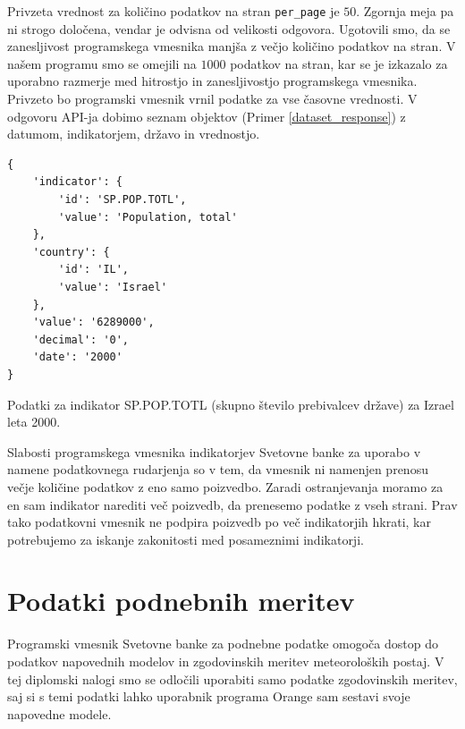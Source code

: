 
Privzeta vrednost za količino podatkov na stran \verb|per_page| je $50$. 
Zgornja meja pa ni strogo določena, vendar je odvisna od velikosti odgovora. 
Ugotovili smo, da se zanesljivost programskega vmesnika manjša z večjo 
količino podatkov na stran. V našem programu smo se omejili na $1000$ podatkov
na stran, kar se je izkazalo za uporabno razmerje med hitrostjo in 
zanesljivostjo programskega vmesnika. Privzeto bo programski vmesnik vrnil 
podatke za vse časovne vrednosti. V odgovoru API-ja dobimo seznam objektov 
(Primer \ref{dataset_response}) z datumom, indikatorjem, državo in vrednostjo.

\begin{snippet}
\begin{center}
\begin{lstlisting}
{
    'indicator': {
        'id': 'SP.POP.TOTL',
        'value': 'Population, total'
    },
    'country': {
        'id': 'IL',
        'value': 'Israel'
    },
    'value': '6289000',
    'decimal': '0',
    'date': '2000'
}
\end{lstlisting}
\end{center}
\caption{Podatki za indikator SP.POP.TOTL (skupno število prebivalcev države) za Izrael leta
2000.}
\label{dataset_response}
\end{snippet} 

Slabosti programskega vmesnika indikatorjev Svetovne banke za uporabo v namene
podatkovnega rudarjenja so v tem, da vmesnik ni namenjen prenosu večje 
količine podatkov z eno samo poizvedbo. Zaradi ostranjevanja moramo za en sam 
indikator narediti več poizvedb, da prenesemo podatke z vseh strani. Prav 
tako podatkovni vmesnik ne podpira poizvedb po več indikatorjih hkrati, kar
potrebujemo za iskanje zakonitosti med posameznimi indikatorji.

\section{Podatki podnebnih meritev}

Programski vmesnik Svetovne banke za podnebne podatke omogoča dostop do 
podatkov napovednih modelov in zgodovinskih meritev meteoroloških postaj. V tej 
diplomski nalogi smo se odločili uporabiti samo podatke zgodovinskih meritev, 
saj si s temi podatki lahko uporabnik programa Orange sam sestavi svoje 
napovedne modele.

